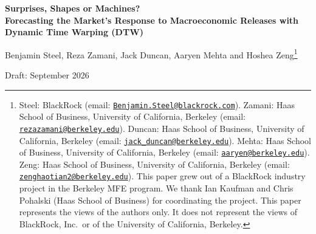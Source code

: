 \documentclass[12pt]{article}
\renewcommand{\thesection}{\Roman{section}}
\renewcommand{\thetable}{\arabic{table}}
\renewcommand{\thefigure}{\arabic{figure}}
\begin{document}
\begin{titlepage}
\begin{center}
{\Large\bfseries Surprises, Shapes or Machines?\\[4pt]
\large Forecasting the Market's Response to Macroeconomic Releases with Dynamic Time Warping (DTW)\par}
\vspace{1.5em}
{\large Benjamin Steel, Reza Zamani, Jack Duncan, Aaryen Mehta and Hoshea Zeng\footnote{%
Steel: BlackRock (email: \href{mailto:Benjamin.Steel@blackrock.com}{\nolinkurl{Benjamin.Steel@blackrock.com}}).
Zamani: Haas School of Business, University of California, Berkeley (email:
\href{mailto:rezazamani@berkeley.edu}{\nolinkurl{rezazamani@berkeley.edu}}).
Duncan: Haas School of Business, University of California, Berkeley (email:
\href{mailto:jack_duncan@berkeley.edu}{\nolinkurl{jack_duncan@berkeley.edu}}).
Mehta: Haas School of Business, University of California, Berkeley (email:
\href{mailto:aaryen@berkeley.edu}{\nolinkurl{aaryen@berkeley.edu}}).
Zeng: Haas School of Business, University of California, Berkeley (email:
\href{mailto:zenghaotian2@berkeley.edu}{\nolinkurl{zenghaotian2@berkeley.edu}}).
This paper grew out of a
BlackRock industry project in the Berkeley MFE program. We thank Ian Kaufman and Chris Pohalski
(Haas School of Business) for coordinating the project. This paper represents the views of the
authors only. It does not represent the views of BlackRock, Inc.\ or of the University of
California, Berkeley.}\par}
\vspace{0.5em}
{\normalsize Draft: September 2026\par}
\end{center}
\vspace{1.5em}



\end{titlepage}











\clearpage
{}


\clearpage
\appendix
\renewcommand{\thesection}{Appendix \Alph{section}}
\setcounter{figure}{0}\setcounter{table}{0}
\renewcommand{\thefigure}{A\arabic{figure}}
\renewcommand{\thetable}{A\arabic{table}}


\end{document}

